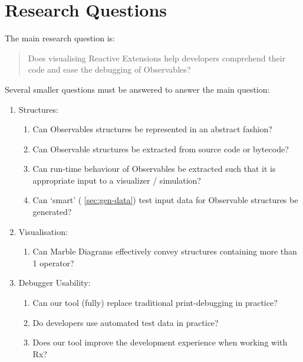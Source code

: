 \documentclass[11pt,a4paper]{article}
\begin{document}
\section{Research Questions}%
\label{sec:questions} The main research question is:

\begin{quotation}
    \noindent
    Does visualising Reactive Extensions help developers comprehend
    their code and ease the debugging of Observables?
\end{quotation}

\noindent
Several smaller questions must be answered to answer the main question:

\begin{enumerate}

    \item
        Structures:
        \begin{enumerate}
            \item
                Can Observables structures be represented in an abstract
                fashion?
            \item
                Can Observable structures be extracted from source code
                or bytecode?
            \item
                Can run-time behaviour of Observables be extracted such
                that it is appropriate input to a visualizer /
                simulation?
            \item
                Can `smart' (%
                \ref{sec:gen-data}) test input data for Observable
                structures be generated?
        \end{enumerate}

    \item
        Visualisation:
        \begin{enumerate}
            \item
                Can Marble Diagrams effectively convey structures
                containing more than 1 operator?
        \end{enumerate}

    \item
        Debugger Usability:
        \begin{enumerate}
            \item
                Can our tool (fully) replace traditional print-debugging
                in practice?
            \item
                Do developers use automated test data in practice?
            \item
                Does our tool improve the development experience when
                working with Rx?
        \end{enumerate}

\end{enumerate}
\end{document}
